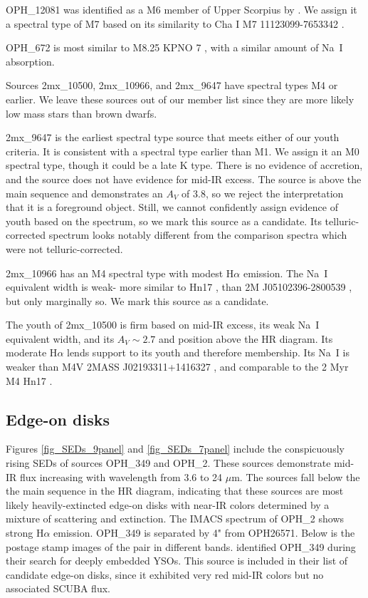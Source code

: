 OPH\_12081 was identified as a M6 member of Upper Scorpius by \citet{2006AJ....131.3016S}.  We assign it a spectral type of M7 based on its similarity to Cha I M7 11123099-7653342 \citep{2004ApJ...602..816L}.

OPH\_672 is most similar to M8.25 KPNO 7 \citep{1998AJ....115.2074B,2003ApJ...593.1093L}, with a similar amount of Na~I absorption.

Sources 2mx\_10500, 2mx\_10966, and 2mx\_9647 have spectral types M4 or earlier.  We leave these sources out of our member list since they are more likely low mass stars than brown dwarfs.

2mx\_9647 is the earliest spectral type source that meets either of our youth criteria.  It is consistent with a spectral type earlier than M1.  We assign it an M0 spectral type, though it could be a late K type.  There is no evidence of accretion, and the source does not have evidence for mid-IR excess.  The source is above the main sequence and demonstrates an $A_V$ of 3.8, so we reject the interpretation that it is a foreground object.  Still, we cannot confidently assign evidence of youth based on the spectrum, so we mark this source as a candidate.  Its telluric-corrected spectrum looks notably different from the comparison spectra which were not telluric-corrected.  

2mx\_10966 has an M4 spectral type with modest H$\alpha$ emission.  The Na~I equivalent width is weak- more similar to Hn17 \citep{2004ApJ...602..816L}, than 2M J05102396-2800539 \citep{2007AJ....133..439C}, but only marginally so.  We mark this source as a candidate.

The youth of 2mx\_10500 is firm based on mid-IR excess, its weak Na~I equivalent width, and its $A_V\sim2.7$ and position above the HR diagram.  Its moderate H$\alpha$ lends support to its youth and therefore membership.  Its Na~I is weaker than M4V 2MASS J02193311+1416327 \citep{2003AJ....126.2421C}, and comparable to the 2 Myr M4 Hn17 \citep{2004ApJ...602..816L}.



\subsection{Edge-on disks}
Figures \ref{fig_SEDs_9panel} and \ref{fig_SEDs_7panel} include the conspicuously rising SEDs of sources OPH\_349 and OPH\_2.  These sources demonstrate mid-IR flux increasing with wavelength from 3.6 to 24 $\mu$m.  The sources fall below the the main sequence in the HR diagram, indicating that these sources are most likely heavily-extincted edge-on disks with near-IR colors determined by a mixture of scattering and extinction.  The IMACS spectrum of OPH\_2 shows strong H$\alpha$ emission.  OPH\_349 is separated by 4" from OPH26571.  Below is the postage stamp images of the pair in different bands.  \cite{2008ApJ...683..822J} identified OPH\_349 during their search for deeply embedded YSOs.  This source is included in their list of candidate edge-on disks, since it exhibited very red mid-IR colors but no associated SCUBA flux.


